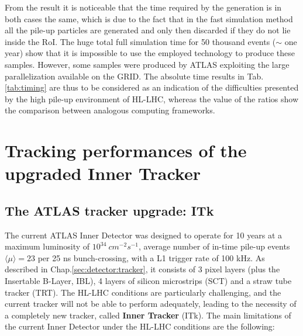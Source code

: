 \documentclass[a4paper,twoside,12pt]{book}
\begin{document}
From the result it is noticeable that the time required by the generation is in both cases
the same, which is due to the fact that in the fast simulation method all the pile-up particles
are generated and only then discarded if they do not lie inside the RoI. The huge total full
simulation time for 50 thousand events ($\sim$ one year) show that it is impossible to use
the employed technology to produce these samples. However, some samples were
produced by ATLAS exploiting the large parallelization available on the GRID. The absolute time results in Tab.\ref{tab:timing} are thus to be
considered as an indication of the difficulties presented by the high pile-up environment of
HL-LHC, whereas the value of the ratios show the comparison between analogous computing
frameworks. 

\clearpage

\chapter{Tracking performances of the upgraded Inner Tracker}\label{sec:tracking}

\section{The ATLAS tracker upgrade: ITk}
The current ATLAS Inner Detector was designed to operate for 10 years at a maximum luminosity of $10^{34}\ cm^{-2} s^{-1}$, 
average number of in-time pile-up events $\langle\mu\rangle = 23$ per 25 ns bunch-crossing, with a L1 trigger rate of 100 kHz\cite{loi}. As described in Chap.\ref{sec:detector:tracker}, it consists of 3 pixel layers (plus the Insertable B-Layer, IBL), 4 layers of silicon microstrips (SCT)
and a straw tube tracker (TRT). The HL-LHC conditions are particularly challenging, and the current tracker will not be able to perform adequately, leading to the necessity of a completely new tracker, called \textbf{Inner Tracker} (ITk). The main limitations of the current Inner Detector under the HL-LHC conditions are the following:
\end{document}
